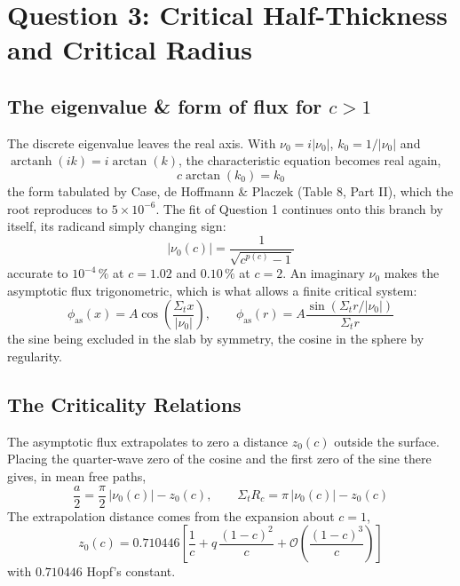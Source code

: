 \documentclass[11pt]{article}
\begin{document}
\section*{Question 3: Critical Half-Thickness and Critical Radius}

\subsection*{The eigenvalue \& form of flux for $c > 1$}
The discrete eigenvalue leaves the real axis. With $\nu_0 = i|\nu_0|$, $k_0 = 1/|\nu_0|$ and $\operatorname{arctanh}(ik) = i\arctan(k)$, the characteristic equation becomes real again,
\begin{equation}
    c \arctan(k_0) = k_0
\end{equation}
the form tabulated by Case, de Hoffmann \& Placzek (Table 8, Part II), which the root reproduces to $5 \times 10^{-6}$. The fit of Question 1 continues onto this branch by itself, its radicand simply changing sign:
\begin{equation}
    |\nu_0(c)| = \frac{1}{\sqrt{c^{p(c)} - 1}}
\end{equation}
accurate to $10^{-4}\,\%$ at $c = 1.02$ and $0.10\,\%$ at $c = 2$. An imaginary $\nu_0$ makes the asymptotic flux trigonometric, which is what allows a finite critical system:
\begin{equation}
    \phi_{\text{as}}(x) = A \cos\!\left(\frac{\Sigma_t x}{|\nu_0|}\right), \qquad
    \phi_{\text{as}}(r) = A \frac{\sin\!\left(\Sigma_t r / |\nu_0|\right)}{\Sigma_t r}
\end{equation}
the sine being excluded in the slab by symmetry, the cosine in the sphere by regularity.

\subsection*{The Criticality Relations}
The asymptotic flux extrapolates to zero a distance $z_0(c)$ outside the surface. Placing the quarter-wave zero of the cosine and the first zero of the sine there gives, in mean free paths,
\begin{equation}
    \frac{a}{2} = \frac{\pi}{2}\,|\nu_0(c)| - z_0(c), \qquad
    \Sigma_t R_c = \pi\,|\nu_0(c)| - z_0(c)
    \label{eq:q3relations}
\end{equation}
The extrapolation distance comes from the expansion about $c = 1$,
\begin{equation}
    z_0(c) = 0.710446 \left[ \frac{1}{c} + q\,\frac{(1-c)^2}{c} + \mathcal{O}\!\left(\frac{(1-c)^3}{c}\right) \right]
    \label{eq:z0fit}
\end{equation}
with $0.710446$ Hopf's constant.
\end{document}
